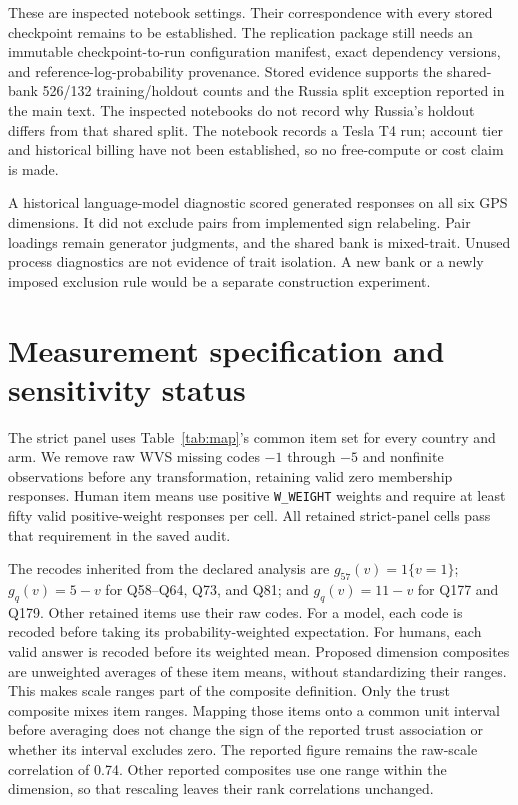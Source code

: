 These are inspected notebook settings. Their correspondence with every stored checkpoint remains to be established. The replication package still needs an immutable checkpoint-to-run configuration manifest, exact dependency versions, and reference-log-probability provenance. Stored evidence supports the shared-bank 526/132 training/holdout counts and the Russia split exception reported in the main text. The inspected notebooks do not record why Russia's holdout differs from that shared split. The notebook records a Tesla T4 run; account tier and historical billing have not been established, so no free-compute or cost claim is made.

A historical language-model diagnostic scored generated responses on all six GPS dimensions. It did not exclude pairs from implemented sign relabeling. Pair loadings remain generator judgments, and the shared bank is mixed-trait. Unused process diagnostics are not evidence of trait isolation. A new bank or a newly imposed exclusion rule would be a separate construction experiment.

\section{Measurement specification and sensitivity status}\label{app:measurement}
The strict panel uses Table~\ref{tab:map}'s common item set for every country and arm. We remove raw WVS missing codes $-1$ through $-5$ and nonfinite observations before any transformation, retaining valid zero membership responses. Human item means use positive \texttt{W\_WEIGHT} weights and require at least fifty valid positive-weight responses per cell. All retained strict-panel cells pass that requirement in the saved audit.

The recodes inherited from the declared analysis are $g_{57}(v)=1\{v=1\}$; $g_q(v)=5-v$ for Q58--Q64, Q73, and Q81; and $g_q(v)=11-v$ for Q177 and Q179. Other retained items use their raw codes. For a model, each code is recoded before taking its probability-weighted expectation. For humans, each valid answer is recoded before its weighted mean. Proposed dimension composites are unweighted averages of these item means, without standardizing their ranges. This makes scale ranges part of the composite definition. Only the trust composite mixes item ranges. Mapping those items onto a common unit interval before averaging does not change the sign of the reported trust association or whether its interval excludes zero. The reported figure remains the raw-scale correlation of 0.74. Other reported composites use one range within the dimension, so that rescaling leaves their rank correlations unchanged.

